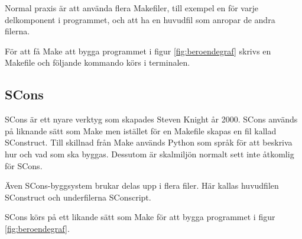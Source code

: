 Normal praxis är att använda flera Makefiler, till exempel en för varje delkomponent i programmet, och att ha en huvudfil som anropar de andra filerna.

För att få Make att bygga programmet i figur \ref{fig:beroendegraf} skrivs en Makefile och följande kommando körs i terminalen.




\subsection{SCons}
SCons är ett nyare verktyg som skapades Steven Knight år 2000. SCons används på liknande sätt som Make men istället för en Makefile skapas en fil kallad SConstruct. Till skillnad från Make används Python som språk för att beskriva hur och vad som ska byggas. Dessutom är skalmiljön normalt sett inte åtkomlig för SCons.

Även SCons-byggsystem brukar delas upp i flera filer. Här kallas huvudfilen SConstruct och underfilerna SConscript.

SCons körs på ett likande sätt som Make för att bygga programmet i figur \ref{fig:beroendegraf}.



